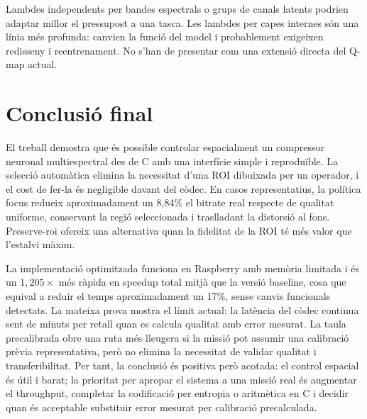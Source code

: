 Lambdes independents per bandes espectrals o grups de canals latents podrien
adaptar millor el pressupost a una tasca. Les lambdes per capes internes són una
línia més profunda: canvien la funció del model i probablement exigeixen
redisseny i reentrenament. No s'han de presentar com una extensió directa del
Q-map actual.

\section{Conclusió final}\label{sec:final_conclusion}

El treball demostra que és possible controlar espacialment un compressor
neuronal multiespectral des de C amb una interfície simple i reproduïble. La
selecció automàtica elimina la necessitat d'una ROI dibuixada per un operador,
i el cost de fer-la és negligible davant del còdec. En casos representatius,
la política focus redueix aproximadament un 8,84\% el bitrate real respecte de
qualitat uniforme, conservant la regió seleccionada i traslladant la distorsió
al fons. Preserve-roi ofereix una alternativa quan la fidelitat de la ROI té
més valor que l'estalvi màxim.

La implementació optimitzada funciona en Raspberry amb memòria limitada i és
un $1,205\times$ més ràpida en speedup total mitjà que la versió baseline, cosa
que equival a reduir el temps aproximadament un 17\%, sense canvis funcionals
detectats. La mateixa prova mostra el límit actual: la
latència del còdec continua sent de minuts per retall quan es calcula qualitat
amb error mesurat. La taula precalibrada obre una ruta més lleugera si la missió
pot assumir una calibració prèvia representativa, però no elimina la necessitat
de validar qualitat i transferibilitat. Per tant, la conclusió és positiva però
acotada: el control espacial és útil i barat; la prioritat per apropar el
sistema a una missió real és augmentar el throughput, completar la codificació
per entropia o aritmètica en C i decidir quan és acceptable substituir error
mesurat per calibració precalculada.
